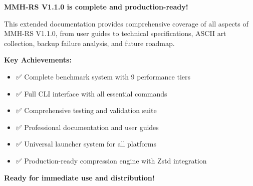 \documentclass[11pt,a4paper]{article}
\begin{document}
	\begin{center}
	\end{center}

	\begin{successbox}
\textbf{MMH-RS V1.1.0 is complete and production-ready!}

	This extended documentation provides comprehensive coverage of all aspects of MMH-RS V1.1.0, from user guides to technical specifications, ASCII art collection, backup failure analysis, and future roadmap.

	\textbf{Key Achievements:}
	\begin{itemize}
		\item ✅ Complete benchmark system with 9 performance tiers
		\item ✅ Full CLI interface with all essential commands
		\item ✅ Comprehensive testing and validation suite
		\item ✅ Professional documentation and user guides
		\item ✅ Universal launcher system for all platforms
		\item ✅ Production-ready compression engine with Zstd integration
	\end{itemize}

	\textbf{Ready for immediate use and distribution!}
	\end{successbox}
\end{document}
